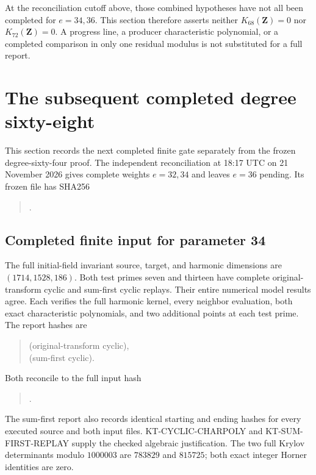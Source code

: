 \documentclass[11pt,a4paper]{article}
\theoremstyle{definition}
\begin{document}
At the reconciliation cutoff above, those combined hypotheses
have not all been completed for $e=34,36$.  This section
therefore asserts neither $K_{68}(\mathbf Z)=0$ nor
$K_{72}(\mathbf Z)=0$.  A progress line, a producer
characteristic polynomial, or a completed comparison in only
one residual modulus is not substituted for a full report.



\section{The subsequent completed degree sixty-eight}
\label{sec:kt-later-vanishing}

This section records the next completed finite gate separately
from the frozen degree-sixty-four proof.  The independent
reconciliation at 18:17 UTC on 21 November 2026 gives complete
weights $e=32,34$ and leaves $e=36$ pending.  Its frozen file
 has SHA256
\begin{quote}\small
{}.
\end{quote}

\subsection{Completed finite input for parameter 34}

The full initial-field invariant source, target, and harmonic
dimensions are $(1714,1528,186)$.  Both test primes seven and
thirteen have complete original-transform cyclic and
sum-first cyclic replays.  Their entire numerical model
results agree.  Each verifies the full harmonic kernel,
every neighbor evaluation, both exact characteristic
polynomials, and two additional points at each test prime.
The report hashes are
\begin{quote}\small
{}
\quad(original-transform cyclic),\\
\quad(sum-first cyclic).
\end{quote}
Both reconcile to the full input hash
\begin{quote}\small
{}.
\end{quote}
The sum-first report also records identical starting and ending
hashes for every executed source and both input files.
KT-CYCLIC-CHARPOLY and KT-SUM-FIRST-REPLAY supply the
checked algebraic justification.  The two full Krylov
determinants modulo $1000003$ are $783829$ and $815725$;
both exact integer Horner identities are zero.
\end{document}
